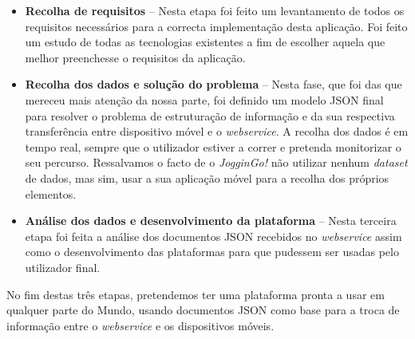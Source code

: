\documentclass[twocolumn,twoside,10pt,a4paper]{article}
\begin{document}
\begin{itemize}
\item \textbf{Recolha de requisitos} -- Nesta etapa foi feito um levantamento de todos os requisitos necessários para a correcta implementação desta aplicação. Foi feito um estudo de todas as tecnologias existentes a fim de escolher aquela que melhor preenchesse o requisitos da aplicação.
\item \textbf{Recolha dos dados e solução do problema} -- Nesta fase, que foi das que mereceu mais atenção da nossa parte, foi definido um modelo JSON final para resolver o problema de estruturação de informação e da sua respectiva transferência entre dispositivo móvel e o \textit{webservice}. A recolha dos dados é em tempo real, sempre que o utilizador estiver a correr e pretenda monitorizar o seu percurso. Ressalvamos o facto de o \emph{JogginGo!} não utilizar nenhum \textit{dataset} de dados, mas sim, usar a sua aplicação móvel para a recolha dos próprios elementos.
\item \textbf{Análise dos dados e desenvolvimento da plataforma}  -- Nesta terceira etapa foi feita a análise dos documentos JSON recebidos no \textit{webservice} assim como o desenvolvimento das plataformas para que pudessem ser usadas pelo utilizador final.
\end{itemize}

No fim destas três etapas, pretendemos ter uma plataforma pronta a usar em qualquer parte do Mundo, usando documentos JSON como base para a troca de informação entre o \textit{webservice} e os dispositivos móveis.


\nocite{*}
\renewcommand{\bibname}{Referências}
%
%

%
{}
\end{document}
